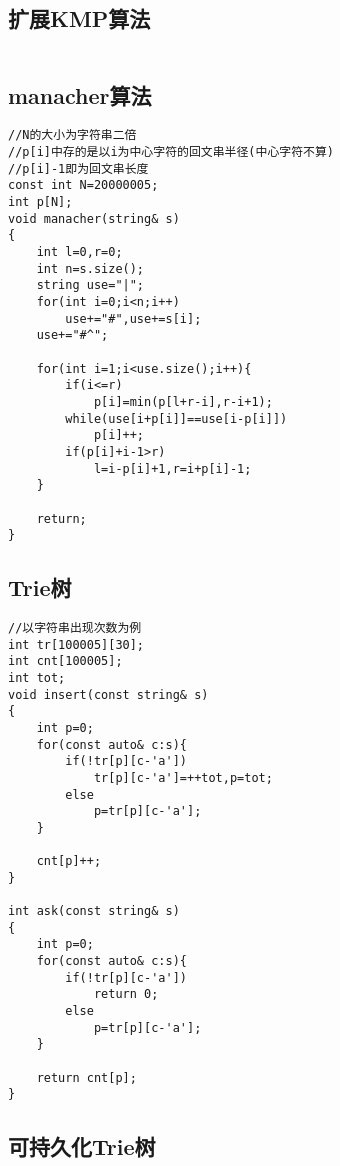 \documentclass[twocolumn,a4]{article}
\begin{document}
\subsection{扩展KMP算法}
\begin{lstlisting}

\end{lstlisting}

\subsection{manacher算法}
\begin{lstlisting}
//N的大小为字符串二倍
//p[i]中存的是以i为中心字符的回文串半径(中心字符不算)
//p[i]-1即为回文串长度
const int N=20000005;
int p[N];
void manacher(string& s)
{
    int l=0,r=0;
    int n=s.size();
    string use="|";
    for(int i=0;i<n;i++)
        use+="#",use+=s[i];
    use+="#^";
    
    for(int i=1;i<use.size();i++){
        if(i<=r)
            p[i]=min(p[l+r-i],r-i+1);
        while(use[i+p[i]]==use[i-p[i]])
            p[i]++;
        if(p[i]+i-1>r)
            l=i-p[i]+1,r=i+p[i]-1;
    }
    
    return;
}
\end{lstlisting}

\subsection{Trie树}
\begin{lstlisting}
//以字符串出现次数为例
int tr[100005][30];
int cnt[100005];
int tot;
void insert(const string& s)
{
    int p=0;
    for(const auto& c:s){
        if(!tr[p][c-'a'])
            tr[p][c-'a']=++tot,p=tot;
        else
            p=tr[p][c-'a'];
    }
    
    cnt[p]++;
}

int ask(const string& s)
{
    int p=0;
    for(const auto& c:s){
        if(!tr[p][c-'a'])
            return 0;
        else
            p=tr[p][c-'a'];
    }
    
    return cnt[p];
}
\end{lstlisting}

\subsection{可持久化Trie树}
\begin{lstlisting}

\end{lstlisting}
\end{document}
